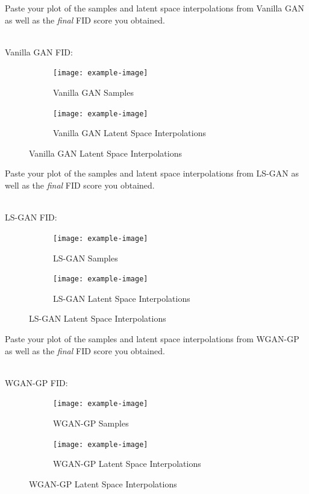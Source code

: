\documentclass[11pt,addpoints,answers]{exam}
\numberwithin{equation}{section} %
\numberwithin{figure}{section} %
\numberwithin{table}{section} %
\begin{document}
\begin{questions}
\question Paste your plot of the samples and latent space interpolations from Vanilla GAN as well as the \textit{final} FID score you obtained. 
\begin{solution}
\\
Vanilla GAN FID: 
\\
\begin{figure}[H]
    \centering
    \begin{subfigure}[b]{0.48\linewidth}
        \texttt{[image: example-image]}
        \caption{Vanilla GAN Samples}
    \end{subfigure}
    \begin{subfigure}[b]{0.48\linewidth}
        \texttt{[image: example-image]}
        \caption{Vanilla GAN Latent Space Interpolations}
    \end{subfigure}
\end{figure}
\end{solution}
\question Paste your plot of the samples and latent space interpolations from LS-GAN as well as the \textit{final} FID score you obtained. 
\begin{solution}
\\
LS-GAN FID: 
\\
\begin{figure}[H]
    \centering
    \begin{subfigure}[b]{0.48\linewidth}
        \texttt{[image: example-image]}
        \caption{LS-GAN Samples}
    \end{subfigure}
    \begin{subfigure}[b]{0.48\linewidth}
        \texttt{[image: example-image]}
        \caption{LS-GAN Latent Space Interpolations}
    \end{subfigure}
\end{figure}
\end{solution}
\question Paste your plot of the samples and latent space interpolations from WGAN-GP as well as the \textit{final} FID score you obtained. 
\\
\begin{solution}
\\
WGAN-GP FID:
\\
\begin{figure}[H]
    \centering
    \begin{subfigure}[b]{0.48\linewidth}
        \texttt{[image: example-image]}
        \caption{WGAN-GP Samples}
    \end{subfigure}
    \begin{subfigure}[b]{0.48\linewidth}
        \texttt{[image: example-image]}
        \caption{WGAN-GP Latent Space Interpolations}
    \end{subfigure}
\end{figure}  
\end{solution}
\end{questions}
\clearpage
\end{document}
